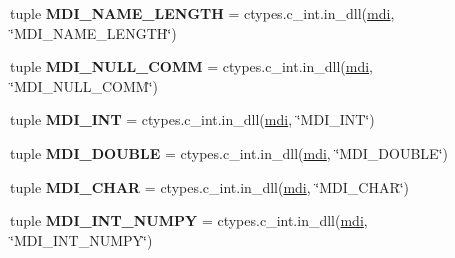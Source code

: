 \begin{DoxyCompactItemize}
\item 
\hypertarget{namespacemolssi__driver__interface_1_1mdi_a3be426ffa2c8696fe44d1bec166a21a8}{tuple {\bfseries M\-D\-I\-\_\-\-N\-A\-M\-E\-\_\-\-L\-E\-N\-G\-T\-H} = ctypes.\-c\-\_\-int.\-in\-\_\-dll(\hyperlink{classmdi}{mdi}, \char`\"{}M\-D\-I\-\_\-\-N\-A\-M\-E\-\_\-\-L\-E\-N\-G\-T\-H\char`\"{})}\label{namespacemolssi__driver__interface_1_1mdi_a3be426ffa2c8696fe44d1bec166a21a8}

\item 
\hypertarget{namespacemolssi__driver__interface_1_1mdi_ae2f6132398baf7a280e420f1f191f3c8}{tuple {\bfseries M\-D\-I\-\_\-\-N\-U\-L\-L\-\_\-\-C\-O\-M\-M} = ctypes.\-c\-\_\-int.\-in\-\_\-dll(\hyperlink{classmdi}{mdi}, \char`\"{}M\-D\-I\-\_\-\-N\-U\-L\-L\-\_\-\-C\-O\-M\-M\char`\"{})}\label{namespacemolssi__driver__interface_1_1mdi_ae2f6132398baf7a280e420f1f191f3c8}

\item 
\hypertarget{namespacemolssi__driver__interface_1_1mdi_a451ed61cd0edd447d5a559ec99d479d5}{tuple {\bfseries M\-D\-I\-\_\-\-I\-N\-T} = ctypes.\-c\-\_\-int.\-in\-\_\-dll(\hyperlink{classmdi}{mdi}, \char`\"{}M\-D\-I\-\_\-\-I\-N\-T\char`\"{})}\label{namespacemolssi__driver__interface_1_1mdi_a451ed61cd0edd447d5a559ec99d479d5}

\item 
\hypertarget{namespacemolssi__driver__interface_1_1mdi_a52d5a1823d4b38b60df486d5b7a76d83}{tuple {\bfseries M\-D\-I\-\_\-\-D\-O\-U\-B\-L\-E} = ctypes.\-c\-\_\-int.\-in\-\_\-dll(\hyperlink{classmdi}{mdi}, \char`\"{}M\-D\-I\-\_\-\-D\-O\-U\-B\-L\-E\char`\"{})}\label{namespacemolssi__driver__interface_1_1mdi_a52d5a1823d4b38b60df486d5b7a76d83}

\item 
\hypertarget{namespacemolssi__driver__interface_1_1mdi_a2f9bb33fbf05ad85f489344f098c19e4}{tuple {\bfseries M\-D\-I\-\_\-\-C\-H\-A\-R} = ctypes.\-c\-\_\-int.\-in\-\_\-dll(\hyperlink{classmdi}{mdi}, \char`\"{}M\-D\-I\-\_\-\-C\-H\-A\-R\char`\"{})}\label{namespacemolssi__driver__interface_1_1mdi_a2f9bb33fbf05ad85f489344f098c19e4}

\item 
\hypertarget{namespacemolssi__driver__interface_1_1mdi_a30427c26974ad9a7bca4651b4a347896}{tuple {\bfseries M\-D\-I\-\_\-\-I\-N\-T\-\_\-\-N\-U\-M\-P\-Y} = ctypes.\-c\-\_\-int.\-in\-\_\-dll(\hyperlink{classmdi}{mdi}, \char`\"{}M\-D\-I\-\_\-\-I\-N\-T\-\_\-\-N\-U\-M\-P\-Y\char`\"{})}\label{namespacemolssi__driver__interface_1_1mdi_a30427c26974ad9a7bca4651b4a347896}


\end{DoxyCompactItemize}
